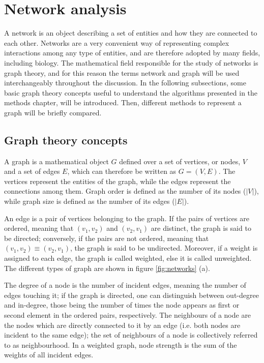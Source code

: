 \section{Network analysis}

A network is an object describing a set of entities and how they are connected to each other. Networks are a very convenient way of representing complex interactions among any type of entities, and are therefore adopted by many fields, including biology. The mathematical field responsible for the study of networks is graph theory, and for this reason the terms network and graph will be used interchangeably throughout the discussion. In the following subsections, some basic graph theory concepts useful to understand the algorithms presented in the methods chapter, will be introduced. Then, different methods to represent a graph will be briefly compared.

\subsection{Graph theory concepts}
A graph is a mathematical object $G$ defined over a set of vertices, or nodes, $V$ and a set of edges $E$, which can therefore be written as $G=(V,E)$. The vertices represent the entities of the graph, while the edges represent the connections among them. Graph order is defined as the number of its nodes ($|V|$), while graph size is defined as the number of its edges ($|E|$).

An edge is a pair of vertices belonging to the graph. If the pairs of vertices are ordered, meaning that $(v_1,v_2)$ and $(v_2, v_1)$ are distinct, the graph is said to be directed; conversely, if the pairs are not ordered, meaning that $(v_1,v_2) \equiv (v_2, v_1)$, the graph is said to be undirected. Moreover, if a weight is assigned to each edge, the graph is called weighted, else it is called unweighted. The different types of graph are shown in figure \ref{fig:networks} (a).

The degree of a node is the number of incident edges, meaning the number of edges touching it; if the graph is directed, one can distinguish between out-degree and in-degree, those being the number of times the node appears as first or second element in the ordered pairs, respectively. The neighbours of a node are the nodes which are directly connected to it by an edge (i.e. both nodes are incident to the same edge); the set of neighbours of a node is collectively referred to as neighbourhood. In a weighted graph, node strength is the sum of the weights of all incident edges. 

